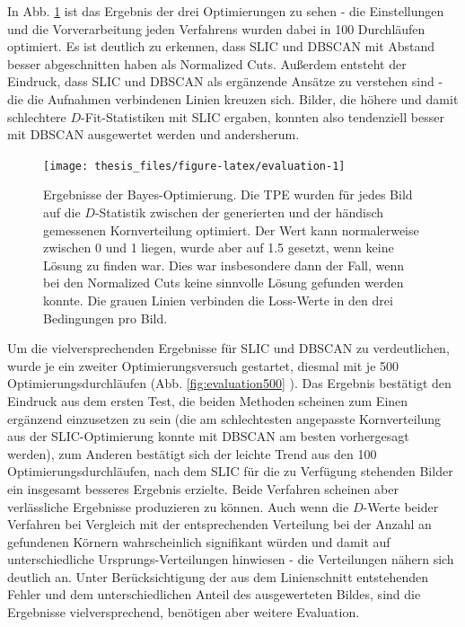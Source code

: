 \documentclass[
  12pt,
  openany]{book}
\begin{document}
In Abb. \ref{fig:evaluation} ist das Ergebnis der drei Optimierungen zu sehen - die Einstellungen und die Vorverarbeitung jeden Verfahrens wurden dabei in 100 Durchläufen optimiert.
Es ist deutlich zu erkennen, dass SLIC und DBSCAN mit Abstand besser abgeschnitten haben als Normalized Cuts. Außerdem entsteht der Eindruck, dass SLIC und DBSCAN als ergänzende Ansätze zu verstehen sind - die die Aufnahmen verbindenen Linien kreuzen sich. Bilder, die höhere und damit schlechtere \(D\)-Fit-Statistiken mit SLIC ergaben, konnten also tendenziell besser mit DBSCAN ausgewertet werden und andersherum.





\begin{figure}

{\centering \texttt{[image: thesis\_files/figure-latex/evaluation-1]} 

}

\caption[Ergebnisse der Bayes-Optimierung.]{Ergebnisse der Bayes-Optimierung. Die TPE wurden für jedes Bild auf die \(D\)-Statistik zwischen der generierten und der händisch gemessenen Kornverteilung optimiert. Der Wert kann normalerweise zwischen 0 und 1 liegen, wurde aber auf 1.5 gesetzt, wenn keine Lösung zu finden war. Dies war insbesondere dann der Fall, wenn bei den Normalized Cuts keine sinnvolle Lösung gefunden werden konnte. Die grauen Linien verbinden die Loss-Werte in den drei Bedingungen pro Bild.}\label{fig:evaluation}
\end{figure}

Um die vielversprechenden Ergebnisse für SLIC und DBSCAN zu verdeutlichen, wurde je ein zweiter Optimierungsversuch gestartet, diesmal mit je 500 Optimierungsdurchläufen (Abb. \ref{fig:evaluation500} ). Das Ergebnis bestätigt den Eindruck aus dem ersten Test, die beiden Methoden scheinen zum Einen ergänzend einzusetzen zu sein (die am schlechtesten angepasste Kornverteilung aus der SLIC-Optimierung konnte mit DBSCAN am besten vorhergesagt werden), zum Anderen bestätigt sich der leichte Trend aus den 100 Optimierungsdurchläufen, nach dem SLIC für die zu Verfügung stehenden Bilder ein insgesamt besseres Ergebnis erzielte. Beide Verfahren scheinen aber verlässliche Ergebnisse produzieren zu können. Auch wenn die \(D\)-Werte beider Verfahren bei Vergleich mit der entsprechenden Verteilung bei der Anzahl an gefundenen Körnern wahrscheinlich signifikant würden und damit auf unterschiedliche Ursprungs-Verteilungen hinwiesen - die Verteilungen nähern sich deutlich an. Unter Berücksichtigung der aus dem Linienschnitt entstehenden Fehler und dem unterschiedlichen Anteil des ausgewerteten Bildes, sind die Ergebnisse vielversprechend, benötigen aber weitere Evaluation.
\end{document}
